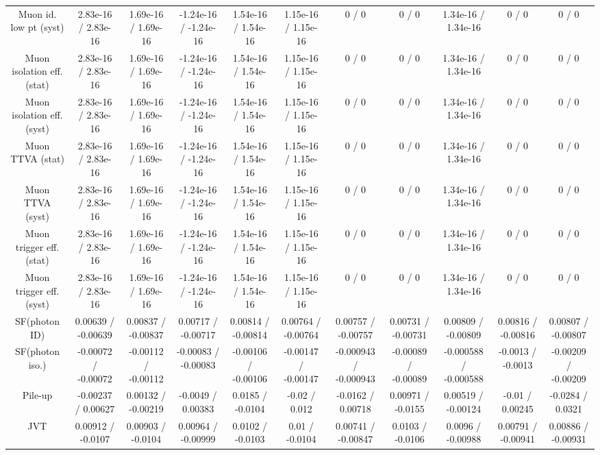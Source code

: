 \begin{table}[htbp]
\begin{center}
\begin{tabular}{|c|c|c|c|c|c|c|c|c|c|c|}
  Muon id. low pt (syst) & 2.83e-16 / 2.83e-16 & 1.69e-16 / 1.69e-16 & -1.24e-16 / -1.24e-16 & 1.54e-16 / 1.54e-16 & 1.15e-16 / 1.15e-16 & 0 / 0 & 0 / 0 & 1.34e-16 / 1.34e-16 & 0 / 0 & 0 / 0 \\ 
  Muon isolation eff. (stat) & 2.83e-16 / 2.83e-16 & 1.69e-16 / 1.69e-16 & -1.24e-16 / -1.24e-16 & 1.54e-16 / 1.54e-16 & 1.15e-16 / 1.15e-16 & 0 / 0 & 0 / 0 & 1.34e-16 / 1.34e-16 & 0 / 0 & 0 / 0 \\ 
  Muon isolation eff. (syst) & 2.83e-16 / 2.83e-16 & 1.69e-16 / 1.69e-16 & -1.24e-16 / -1.24e-16 & 1.54e-16 / 1.54e-16 & 1.15e-16 / 1.15e-16 & 0 / 0 & 0 / 0 & 1.34e-16 / 1.34e-16 & 0 / 0 & 0 / 0 \\ 
  Muon TTVA (stat) & 2.83e-16 / 2.83e-16 & 1.69e-16 / 1.69e-16 & -1.24e-16 / -1.24e-16 & 1.54e-16 / 1.54e-16 & 1.15e-16 / 1.15e-16 & 0 / 0 & 0 / 0 & 1.34e-16 / 1.34e-16 & 0 / 0 & 0 / 0 \\ 
  Muon TTVA (syst) & 2.83e-16 / 2.83e-16 & 1.69e-16 / 1.69e-16 & -1.24e-16 / -1.24e-16 & 1.54e-16 / 1.54e-16 & 1.15e-16 / 1.15e-16 & 0 / 0 & 0 / 0 & 1.34e-16 / 1.34e-16 & 0 / 0 & 0 / 0 \\ 
  Muon trigger eff. (stat) & 2.83e-16 / 2.83e-16 & 1.69e-16 / 1.69e-16 & -1.24e-16 / -1.24e-16 & 1.54e-16 / 1.54e-16 & 1.15e-16 / 1.15e-16 & 0 / 0 & 0 / 0 & 1.34e-16 / 1.34e-16 & 0 / 0 & 0 / 0 \\ 
  Muon trigger eff. (syst) & 2.83e-16 / 2.83e-16 & 1.69e-16 / 1.69e-16 & -1.24e-16 / -1.24e-16 & 1.54e-16 / 1.54e-16 & 1.15e-16 / 1.15e-16 & 0 / 0 & 0 / 0 & 1.34e-16 / 1.34e-16 & 0 / 0 & 0 / 0 \\ 
  SF(photon ID) & 0.00639 / -0.00639 & 0.00837 / -0.00837 & 0.00717 / -0.00717 & 0.00814 / -0.00814 & 0.00764 / -0.00764 & 0.00757 / -0.00757 & 0.00731 / -0.00731 & 0.00809 / -0.00809 & 0.00816 / -0.00816 & 0.00807 / -0.00807 \\ 
  SF(photon iso.) & -0.00072 / -0.00072 & -0.00112 / -0.00112 & -0.00083 / -0.00083 & -0.00106 / -0.00106 & -0.00147 / -0.00147 & -0.000943 / -0.000943 & -0.00089 / -0.00089 & -0.000588 / -0.000588 & -0.0013 / -0.0013 & -0.00209 / -0.00209 \\ 
  Pile-up & -0.00237 / 0.00627 & 0.00132 / -0.00219 & -0.0049 / 0.00383 & 0.0185 / -0.0104 & -0.02 / 0.012 & -0.0162 / 0.00718 & 0.00971 / -0.0155 & 0.00519 / -0.00124 & -0.01 / 0.00245 & -0.0284 / 0.0321 \\ 
  JVT & 0.00912 / -0.0107 & 0.00903 / -0.0104 & 0.00964 / -0.00999 & 0.0102 / -0.0103 & 0.01 / -0.0104 & 0.00741 / -0.00847 & 0.0103 / -0.0106 & 0.0096 / -0.00988 & 0.00791 / -0.00941 & 0.00886 / -0.00931 \\ 

\end{tabular}
\end{center}
\end{table}
